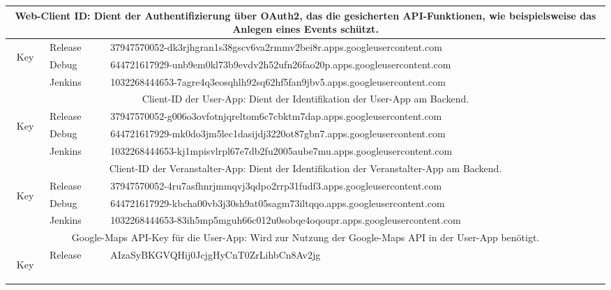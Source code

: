 \noindent
\begin{tabular}{|c|l|l|}
	\hline
	\multicolumn{3}{|p{15cm}|}{
		Web-Client ID: Dient der Authentifizierung über OAuth2, das die gesicherten API-Funktionen, wie beispielsweise das Anlegen eines Events schützt.
	} \\
	\hline
	\multirow{3}{3mm}{\begin{sideways}Key\end{sideways}} & Release & 37947570052-dk3rjhgran1s38gscv6va2rmmv2bei8r.apps.googleusercontent.com \\
	\cline{2-3}
	& Debug & 644721617929-unb9em0kl73b9evdv2h52ufn26fao20p.apps.googleusercontent.com \\
	\cline{2-3}
	& Jenkins & 1032268444653-7agre4q3eosqhlh92sq62hf5fan9jbv5.apps.googleusercontent.com \\
	\hline
	\hline
	\multicolumn{3}{|p{15cm}|}{
		Client-ID der User-App: Dient der Identifikation der User-App am Backend.
	} \\
	\hline
	\multirow{3}{3mm}{\begin{sideways}Key\end{sideways}} & Release & 37947570052-g006o3ovfotnjqreltom6c7cbktm7dap.apps.googleusercontent.com \\
	\cline{2-3}
	& Debug & 644721617929-mk0do3jm5lec1dasijdj3220ot87gbn7.apps.googleusercontent.com \\
	\cline{2-3}
	& Jenkins & 1032268444653-kj1mpisvlrpl67e7db2fu2005aube7mu.apps.googleusercontent.com \\
	\hline
	\hline
	\multicolumn{3}{|p{15cm}|}{
		Client-ID der Veranstalter-App: Dient der Identifikation der Veranstalter-App am Backend.
	} \\
	\hline
	\multirow{3}{3mm}{\begin{sideways}Key\end{sideways}} & Release & 37947570052-4ru7asfhnrjmmqvj3qdpo2rrp31fudf3.apps.googleusercontent.com \\
	\cline{2-3}
	& Debug & 644721617929-kbcha00vb3j30sh9at05sagm73iltqqo.apps.googleusercontent.com \\
	\cline{2-3}
	& Jenkins & 1032268444653-83ih5mp5mguh66c012u0sobqe4oqoupr.apps.googleusercontent.com \\
	\hline
	\hline
	\multicolumn{3}{|p{15cm}|}{
		Google-Maps API-Key für die User-App: Wird zur Nutzung der Google-Maps API in der User-App benötigt.
	} \\
	\hline
	\multirow{3}{3mm}{\begin{sideways}Key\end{sideways}} & Release & AIzaSyBKGVQHij0JcjgHyCnT0ZrLihbCn8Av2jg \\

\end{tabular}
